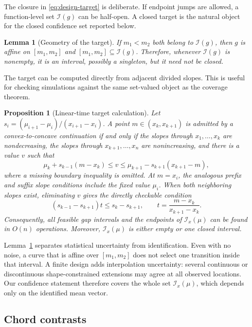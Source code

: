 \documentclass{interact}
\newtheorem{proposition}[theorem]{Proposition}
\newtheorem{lemma}[theorem]{Lemma}
\theoremstyle{definition}
\theoremstyle{remark}
\newcommand{\I}{\mathcal{I}}
\begin{document}
The closure in \eqref{eq:design-target} is deliberate.  If endpoint jumps are
allowed, a function-level set $\I(g)$ can be half-open.  A closed target is the
natural object for the closed confidence set reported below.

\begin{lemma}[Geometry of the target]
\label{lem:identified}
If $m_1<m_2$ both belong to $\I(g)$, then $g$ is affine on $[m_1,m_2]$ and
$[m_1,m_2]\subseteq\I(g)$.  Therefore, whenever $\I(g)$ is nonempty, it is an
interval, possibly a singleton, but it need not be closed.
\end{lemma}

The target can be computed directly from adjacent divided slopes.  This is
useful for checking simulations against the same set-valued object as the
coverage theorem.

\begin{proposition}[Linear-time target calculation]
\label{prop:target-computation}
Let $s_i=(\mu_{i+1}-\mu_i)/(x_{i+1}-x_i)$.  A point
$m\in(x_k,x_{k+1})$ is admitted by a convex-to-concave continuation if and
only if the slopes through $x_1,\ldots,x_k$ are nondecreasing, the slopes
through $x_{k+1},\ldots,x_n$ are nonincreasing, and there is a value $v$ such
that
\begin{equation}
 \mu_k+s_{k-1}(m-x_k)\leq v\leq
 \mu_{k+1}-s_{k+1}(x_{k+1}-m),
\label{eq:target-gap}
\end{equation}
where a missing boundary inequality is omitted.  At $m=x_i$, the analogous
prefix and suffix slope conditions include the fixed value $\mu_i$.
When both neighboring slopes exist, eliminating $v$ gives the directly
checkable condition
\[
 (s_{k-1}-s_{k+1})t\leq s_k-s_{k+1},
 \qquad t=\frac{m-x_k}{x_{k+1}-x_k}.
\]
Consequently, all feasible gap intervals and the endpoints of
$\I_x(\mu)$ can be found in $O(n)$ operations.  Moreover,
$\I_x(\mu)$ is either empty or one closed interval.
\end{proposition}

Lemma~\ref{lem:identified} separates statistical uncertainty from
identification.  Even with
no noise, a curve that is affine over $[m_1,m_2]$ does not select one transition
inside that interval.  A finite design adds interpolation uncertainty: several
continuous or discontinuous shape-constrained extensions may agree at all
observed locations.  Our confidence statement therefore covers the whole set
$\I_x(\mu)$, which depends only on the identified mean vector.

\subsection{Chord contrasts}
\end{document}

